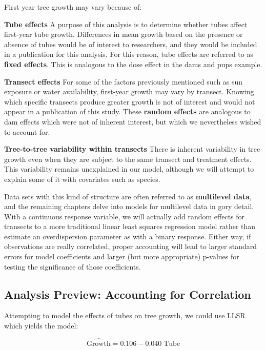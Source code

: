 \documentclass[
]{krantz}
\begin{document}
First year tree growth may vary because of:

\textbf{Tube effects} A purpose of this analysis is to determine whether tubes affect first-year tube growth. Differences in mean growth based on the presence or absence of tubes would be of interest to researchers, and they would be included in a publication for this analysis. For this reason, tube effects are referred to as \textbf{fixed effects}. This is analogous to the dose effect in the dams and pups example.

\textbf{Transect effects} For some of the factors previously mentioned such as sun exposure or water availability, first-year growth may vary by transect. Knowing which specific transects produce greater growth is not of interest and would not appear in a publication of this study. These \textbf{random effects} are analogous to dam effects which were not of inherent interest, but which we nevertheless wished to account for.

\textbf{Tree-to-tree variability within transects} There is inherent variability in tree growth even when they are subject to the same transect and treatment effects. This variability remains unexplained in our model, although we will attempt to explain some of it with covariates such as species.

Data sets with this kind of structure are often referred to as \textbf{multilevel data},  and the remaining chapters delve into models for multilevel data in gory detail. With a continuous response variable, we will actually add random effects for transects to a more traditional linear least squares regression model rather than estimate an overdispersion parameter as with a binary response. Either way, if observations are really correlated, proper accounting will lead to larger standard errors for model coefficients and larger (but more appropriate) p-values for testing the significance of those coefficients.

\subsection{Analysis Preview: Accounting for Correlation}\label{analysis-preview-accounting-for-correlation}

Attempting to model the effects of tubes on tree growth, we could use LLSR which yields the model:

\begin{equation*}
  \hat{\textrm{Growth}} = 0.106 - 0.040\; \textrm{Tube}
\end{equation*}
\end{document}
